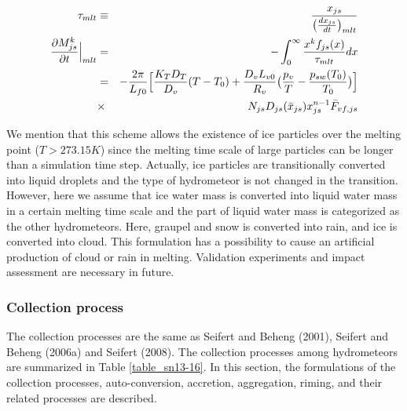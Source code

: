 \begin{eqnarray}
\tau_{mlt}&\equiv&\frac{x_{js}}{\bigl(\frac{dx_{js}}{dt}\bigr)_{mlt}}\label{sn129}\\
\frac{\partial M_{js}^{k}}{\partial t}\Bigr|_{mlt}&=&-\int_{0}^{\infty}\frac{x^{k}f_{js}(x)}{\tau_{mlt}}dx\nonumber\\
&=&-\frac{2\pi}{L_{f0}}\Bigl[\frac{K_{T}D_{T}}{D_{v}}(T-T_{0})+\frac{D_{v}L_{v0}}{R_{v}}\bigl(\frac{p_{v}}{T}-\frac{p_{sw}(T_{0})}{T_{0}}\bigr)\Bigr]\nonumber\\
&\times& N_{js}D_{js}(\bar{x}_{js})x_{js}^{n-1}\bar{F}_{vf,js}
\label{sn130}
\end{eqnarray}

We mention that this scheme allows the existence of ice particles over the melting point ($T>273.15 K$) since the melting time scale of large particles can be longer than a simulation time step. Actually, ice particles are transitionally converted into liquid droplets and the type of hydrometeor is not changed in the transition. However, here we assume that ice water mass is converted into liquid water mass in a certain melting time scale and the part of liquid water mass is categorized as the other hydrometeors. Here, graupel and snow is converted into rain, and ice is converted into cloud. This formulation has a possibility to cause an artificial production of cloud or rain in melting. Validation experiments and impact assessment are necessary in future.

\subsubsection{Collection process}
The collection processes are the same as Seifert and Beheng (2001), Seifert and Beheng (2006a) and Seifert (2008). The collection processes among hydrometeors are summarized in Table \ref{table_sn13-16}. In this section, the formulations of the collection processes, auto-conversion, accretion, aggregation, riming, and their related processes are described.


